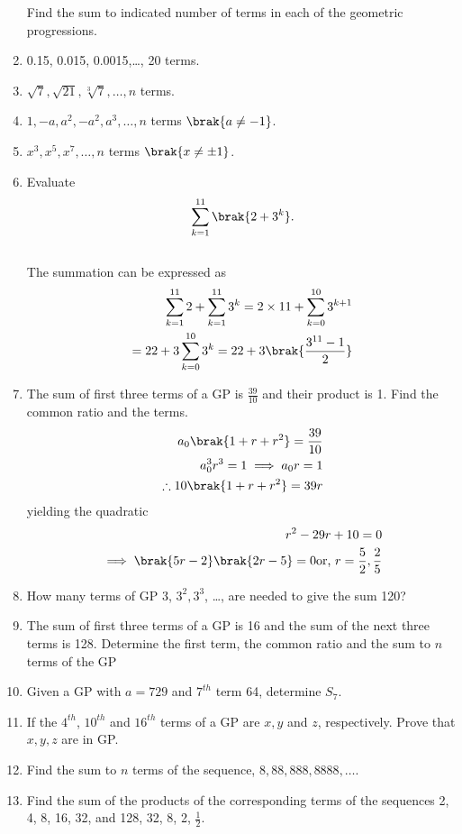 \begin{enumerate}[label=\thesubsection.\arabic*.,ref=\thesubsection.\theenumi]
	Find the sum to indicated number of terms in each of the geometric progressions.
\item 0.15, 0.015, 0.0015,\dots,  20 terms.
\item $\sqrt{7}, \sqrt{21}, \sqrt[3]{7}, \dots,  n$ terms.
\item $1, -a, a^2, -a^2, a^3,\dots,  n$ terms $\brak{a \neq -1}$.
\item $x^3, x^5, x^7,\dots,  n$ terms $\brak{x \neq \pm 1}$.
\item Evaluate $$\sum _{k=1}^{11} \brak{2 + 3^k}.$$
	\\
	\solution  The summation can be expressed as
\begin{align}
\sum _{k=1}^{11} 2 +\sum _{k=1}^{11} 3^k
	=2\times 11 +\sum _{k=0}^{10} 3^{k+1}
	\\
	=22+3\sum _{k=0}^{10} 3^{k}=22+3\brak{\frac{3^{11}-1}{2}}
\end{align}
\item The sum of first three terms of a GP  is $\frac{39}{10}$ and their product is 1. Find the 
common ratio and the terms.
	\\
	\solution
\begin{align}
	a_0\brak{1+r+r^2}=\frac{39}{10}
	\\
	a_0^3r^3=1 \implies a_0r = 1
	\\
	\therefore
	{10}\brak{1+r+r^2}={39}r
\end{align}
yielding the quadratic
\begin{align}
	{10}r^2-29r + 10=0
	\\
	\implies \brak{5r - 2}\brak{2r-5}=0
	\text{or, }
	r = \frac{5}{2},\frac{2}{5}
\end{align}
\item How many terms of GP  3, $3^2, 3^3$, \dots,  are needed to give the sum 120?
\item The sum of first three terms of a GP  is 16 and the sum of the next three terms is 128. Determine the first term, the common ratio and the sum to $n$ terms of the GP 
\item Given a GP  with $a = 729$ and $7^{th}$ term 64, determine $S_7$.
\item If the $4^{th}$, $10^{th}$ and $16^{th}$ terms of a GP  are $x, y$ and $z$, respectively. Prove that $x, y, z$ are in GP.
\item Find the sum to $n$ terms of the sequence, $8, 88, 888, 8888, \dots$. 
\item Find the sum of the products of the corresponding terms of the sequences 2, 4, 8, 16, 32, and 128, 32, 8, 2, $\frac{1}{2}$.

\end{enumerate}
